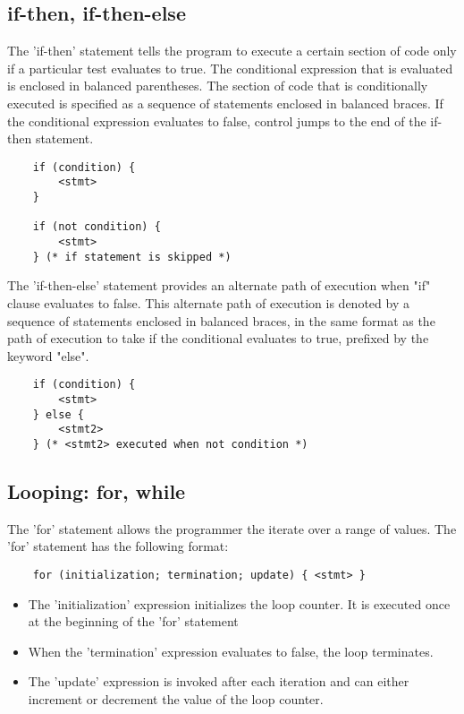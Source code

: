 \begin{homeworkProblem}
	\subsection{if-then, if-then-else}
	The 'if-then' statement tells the program to execute a certain section of code only if a particular test evaluates to true. The conditional expression that is evaluated is enclosed in balanced parentheses. The section of code that is conditionally executed is specified as a sequence of statements enclosed in balanced braces. If the conditional expression evaluates to false, control jumps to the end of the if-then statement.
	\begin{verbatim} 
	if (condition) {
		<stmt>
	}
	
	if (not condition) {
		<stmt>
	} (* if statement is skipped *)
	\end{verbatim}
	
	The 'if-then-else' statement provides an alternate path of execution when "if" clause evaluates to false. This alternate path of execution is denoted by a sequence of statements enclosed in balanced braces, in the same format as the path of execution to take if the conditional evaluates to true, prefixed by the keyword "else".
	\begin{verbatim} 
	if (condition) {
		<stmt>
	} else {
		<stmt2>
	} (* <stmt2> executed when not condition *)
	\end{verbatim}
		
	\subsection{Looping: for, while}
	The 'for' statement allows the programmer the iterate over a range of values. The 'for' statement has the following format:
	\begin{verbatim} 
	for (initialization; termination; update) { <stmt> }
	\end{verbatim}
	
	\begin{itemize}
		\item The 'initialization' expression initializes the loop counter. It is executed once at the beginning of the 'for' statement
		\item When the 'termination' expression evaluates to false, the loop terminates.
		\item The 'update' expression is invoked after each iteration and can either increment or decrement the value of the loop counter.
	\end{itemize}


\end{homeworkProblem}
